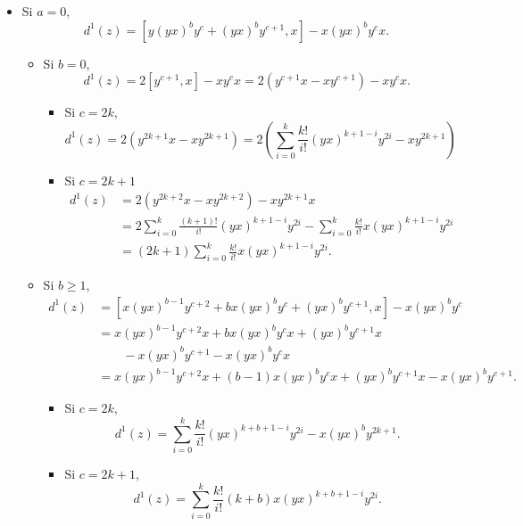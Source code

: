 \documentclass[fleqn,../tesis.tex]{subfiles}
\begin{document}
\begin{itemize}
    \item Si $a = 0$,
        \[
            d^1(z) = \left[y(yx)^by^c + (yx)^by^{c + 1}, x\right] - x(yx)^by^cx.        
        \]
    \begin{itemize}
        \item Si $b = 0$,
        \[
            d^1(z) = 2\left[y^{c + 1}, x\right] - xy^cx = 2\left(y^{c + 1}x - xy^{c + 1}\right) - xy^cx.     
        \]
        \begin{itemize}
            \item Si $c = 2k$,
            \[
                d^1(z) = 2\left(y^{2k + 1}x - xy^{2k + 1}\right) = 2\left(\sum_{i = 0}^k \frac{k!}{i!}(yx)^{k + 1 - i}y^{2i} - xy^{2k + 1}\right)
            \]
            \item Si $c = 2k + 1$
            \begin{align*}
                d^1(z) &= 2\left(y^{2k + 2}x - xy^{2k + 2}\right) - xy^{2k + 1}x\\
                &= 2\sum_{i = 0}^{k}\frac{(k + 1)!}{i!}(yx)^{k + 1 - i}y^{2i} - \sum_{i = 0}^k \frac{k!}{i!}x(yx)^{k + 1 - i}y^{2i}\\
                & = (2k + 1)\sum_{i = 0}^k \frac{k!}{i!}x(yx)^{k + 1 - i}y^{2i}.
            \end{align*}
        \end{itemize}
        \item Si $b \geq 1$,
        \begin{align*}
            d^1(z) &= \left[x(yx)^{b - 1}y^{c + 2} + b x(yx)^{b}y^c + (yx)^{b}y^{c + 1}, x\right] - x(yx)^by^c \\
            &= x(yx)^{b - 1}y^{c + 2}x + bx(yx)^by^cx + (yx)^{b}y^{c + 1}x\\
            &\qquad - x(yx)^{b}y^{c + 1} - x(yx)^by^cx\\
            &= x(yx)^{b - 1}y^{c + 2}x + (b - 1)x(yx)^by^cx + (yx)^{b}y^{c + 1}x - x(yx)^{b}y^{c + 1}.
        \end{align*}
        \begin{itemize}
            \item Si $c = 2k$,
                \[
                    d^1(z) = \sum_{i =0}^{k}\frac{k!}{i!}(yx)^{k + b + 1 - i}y^{2i} - x(yx)^by^{2k + 1}.          
                \]
            \item Si $c = 2k + 1$,
                \[
                    d^1(z) = \sum_{i = 0}^{k}\frac{k!}{i!}(k + b)x(yx)^{k +  b + 1 - i}y^{2i}.
                \]

\end{itemize}
\end{itemize}
\end{itemize}
\end{document}
